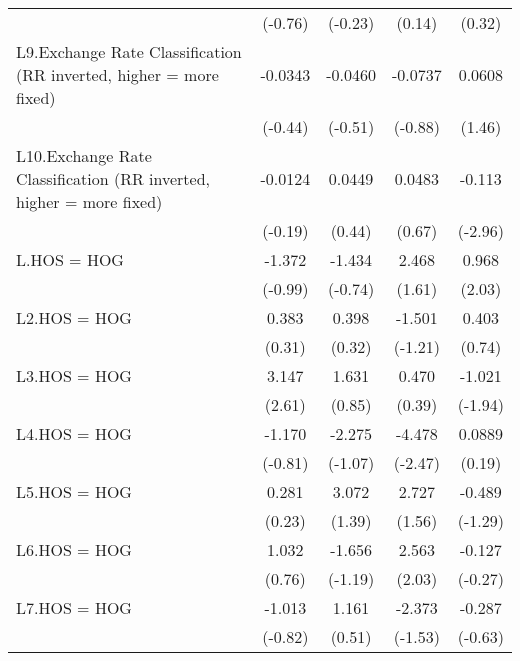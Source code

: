 {\begin{tabular}{l*{4}{c}}
                &  (-0.76)         &  (-0.23)         &   (0.14)         &   (0.32)         \\
[1em]
L9.Exchange Rate Classification (RR inverted, higher = more fixed)&  -0.0343         &  -0.0460         &  -0.0737         &   0.0608         \\
                &  (-0.44)         &  (-0.51)         &  (-0.88)         &   (1.46)         \\
[1em]
L10.Exchange Rate Classification (RR inverted, higher = more fixed)&  -0.0124         &   0.0449         &   0.0483         &   -0.113\sym{**} \\
                &  (-0.19)         &   (0.44)         &   (0.67)         &  (-2.96)         \\
[1em]
L.HOS = HOG     &   -1.372         &   -1.434         &    2.468         &    0.968\sym{*}  \\
                &  (-0.99)         &  (-0.74)         &   (1.61)         &   (2.03)         \\
[1em]
L2.HOS = HOG    &    0.383         &    0.398         &   -1.501         &    0.403         \\
                &   (0.31)         &   (0.32)         &  (-1.21)         &   (0.74)         \\
[1em]
L3.HOS = HOG    &    3.147\sym{**} &    1.631         &    0.470         &   -1.021         \\
                &   (2.61)         &   (0.85)         &   (0.39)         &  (-1.94)         \\
[1em]
L4.HOS = HOG    &   -1.170         &   -2.275         &   -4.478\sym{*}  &   0.0889         \\
                &  (-0.81)         &  (-1.07)         &  (-2.47)         &   (0.19)         \\
[1em]
L5.HOS = HOG    &    0.281         &    3.072         &    2.727         &   -0.489         \\
                &   (0.23)         &   (1.39)         &   (1.56)         &  (-1.29)         \\
[1em]
L6.HOS = HOG    &    1.032         &   -1.656         &    2.563\sym{*}  &   -0.127         \\
                &   (0.76)         &  (-1.19)         &   (2.03)         &  (-0.27)         \\
[1em]
L7.HOS = HOG    &   -1.013         &    1.161         &   -2.373         &   -0.287         \\
                &  (-0.82)         &   (0.51)         &  (-1.53)         &  (-0.63)         \\

\end{tabular}}
